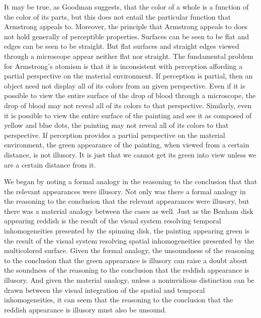 \documentclass[12pt]{article}
\begin{document}
It may be true, as Goodman suggests, that the color of a whole is a function of the color of its parts, but this does not entail the particular function that Armstrong appeals to. Moreover, the principle that Armstrong appeals to does not hold generally of perceptible properties. Surfaces can be seen to be flat and edges can be seen to be straight. But flat surfaces and straight edges viewed through a microscope appear neither flat nor straight. The fundamental problem for Armstrong's atomism is that it is inconsistent with perception affording a partial perspective on the material environment. If perception is partial, then an object need not display all of its colors from an given perspective. Even if it is possible to view the entire surface of the drop of blood through a microscope, the drop of blood may not reveal all of its colors to that perspective. Similarly, even it is possible to view the entire surface of the painting and see it as composed of yellow and blue dots, the painting may not reveal all of its colors to that perspective. If perception provides a partial perspective on the material environment, the green appearance of the painting, when viewed from a certain distance, is not illusory. It is just that we cannot get its green into view unless we are a certain distance from it.

We began by noting a formal analogy in the reasoning to the conclusion that that the relevant appearances were illusory. Not only was there a formal analogy in the reasoning to the conclusion that the relevant appearances were illusory, but there was a material analogy between the cases as well. Just as the Benham disk appearing reddish is the result of the visual system resolving temporal inhomogeneities presented by the spinning disk, the painting appearing green is the result of the visual system resolving spatial inhomogeneities presented by the multicolored surface. Given the formal analogy, the unsoundness of the reasoning to the conclusion that the green appearance is illusory can raise a doubt about the soundness of the reasoning to the conclusion that the reddish appearance is illusory. And given the material analogy, unless a noninvidious distinction can be drawn between the visual integration of the spatial and temporal inhomogeneities, it can seem that the reasoning to the conclusion that the reddish appearance is illusory must also be unsound. 
\end{document}
